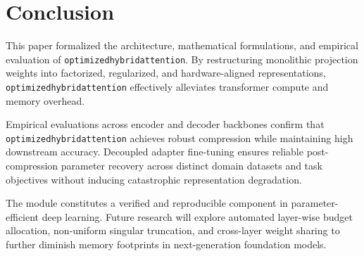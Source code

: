 \section{Conclusion}
This paper formalized the architecture, mathematical formulations, and empirical evaluation of \texttt{optimizedhybridattention}. By restructuring monolithic projection weights into factorized, regularized, and hardware-aligned representations, \texttt{optimizedhybridattention} effectively alleviates transformer compute and memory overhead.

Empirical evaluations across encoder and decoder backbones confirm that \texttt{optimizedhybridattention} achieves robust compression while maintaining high downstream accuracy. Decoupled adapter fine-tuning ensures reliable post-compression parameter recovery across distinct domain datasets and task objectives without inducing catastrophic representation degradation.

The module constitutes a verified and reproducible component in parameter-efficient deep learning. Future research will explore automated layer-wise budget allocation, non-uniform singular truncation, and cross-layer weight sharing to further diminish memory footprints in next-generation foundation models.
